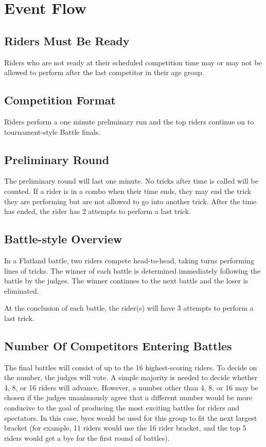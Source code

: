 \section{Event Flow}

\subsection{Riders Must Be Ready}

Riders who are not ready at their scheduled competition time may or may not be allowed to perform after the last competitor in their age group.

\subsection{Competition Format}
Riders perform a one minute preliminary run and the top riders continue on to tournament-style Battle finals.

\subsection{Preliminary Round}

The preliminary round will last one minute.
No tricks after time is called will be counted.
If a rider is in a combo when their time ends, they may end the trick they are performing but are not allowed to go into another trick.
After the time has ended, the rider has 2 attempts to perform a last trick.

\subsection{Battle-style Overview}
In a Flatland battle, two riders compete head-to-head, taking turns performing lines of tricks.
The winner of each battle is determined immediately following the battle by the judges.
The winner continues to the next battle and the loser is eliminated.

At the conclusion of each battle, the rider(s) will have 3 attempts to perform a last trick.

\subsection{Number Of Competitors Entering Battles}
The final battles will consist of up to the 16 highest-scoring riders.
To decide on the number, the judges will vote.
A simple majority is needed to decide whether 4, 8, or 16 riders will advance.
However, a number other than 4, 8, or 16 may be chosen if the judges unanimously agree that a different number would be more conducive to the goal of producing the most exciting battles for riders and spectators.
In this case, byes would be used for this group to fit the next largest bracket (for example, 11 riders would use the 16 rider bracket, and the top 5 riders would get a bye for the first round of battles).

